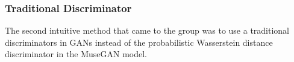 \begin{par}
        \subsubsection{Traditional Discriminator} %
        \label{ssub:Traditional Discriminator}
            \par \hspace{15pt}  The second intuitive method that came to the group was to use a traditional discriminators in GANs \cite{generative} instead of the probabilistic Wasserstein distance discriminator in the MuseGAN model. 

    

\end{par}